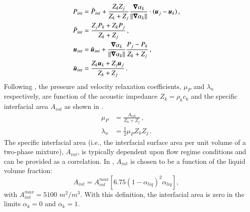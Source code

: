 \documentclass[preprint,10pt]{elsarticle}
\begin{document}
\begin{subequations}
\label{eq:int_variables_def}
\begin{align}
  \label{E-R:83}
  P_{int} &= \bar{P}_{int} + \frac{Z_{k}Z_{j}}{Z_{k}+Z_{j}} \frac{\boldsymbol\nabla \alpha_{k}}{|| \boldsymbol\nabla \alpha_{k} ||} \cdot (\boldsymbol u_{j}-\boldsymbol u_{k}) \,,
  \\
  \bar{P}_{int} &= \frac{Z_{j}P_{k}+Z_{k}P_{j}}{Z_{k}+Z_{j}} \,,
 \\
  \label{E-R:84}
  \boldsymbol u_{int} &= \bar{\boldsymbol u}_{int} +  \frac{\boldsymbol\nabla \alpha_{k}}{|| \boldsymbol\nabla \alpha_{k} ||} \frac{P_{j}-P_{k}}{Z_{k}+Z_{j}} \,,
  \\
  \bar{\boldsymbol u}_{int} &= \frac{Z_{k} \boldsymbol u_{k}+Z_{j}\boldsymbol u_{j}}{Z_{k}+Z_{j}} \,.
\end{align}
\end{subequations}
%
Following \cite{SEM}, the pressure and velocity relaxation coefficients, $\mu_P$  and $\lambda_u$ respectively, are function of the acoustic impedance $Z_k = \rho_k c_k$ and the specific interfacial area $A_{int}$ as shown in .
%
\begin{subequations}
\label{eq:relaxation_coeff}
\begin{align}
  \label{E-R:86}
  \mu_P &= \frac{A_{int}}{Z_{k}+Z_{j}}       \,,
  \\
  \label{E-R:85}
  \lambda_u &= \frac{1}{2} \mu_P Z_{k} Z_{j} \,.
\end{align}
\end{subequations}
%
The specific interfacial area (i.e., the interfacial surface area per unit
volume of a two-phase mixture), $A_{int}$, is typically dependent upon flow regime conditions and can be provided as a correlation. In \cite{SEM}, $A_{int}$ is chosen to be a function of the liquid volume fraction:
%
\begin{equation}\label{eq:Aint-sect4}
A_{int} = A_{int}^{max} \left[ 6.75 \left(1-\alpha_{liq} \right)^2 \alpha_{liq} \right],
\end{equation}
% 
with $A_{int}^{max} = 5100$ $m^2 / m^3$. With this definition, the interfacial area is zero in the limits $\alpha_{k} = 0$ and $\alpha_{k} = 1$. 
\end{document}
